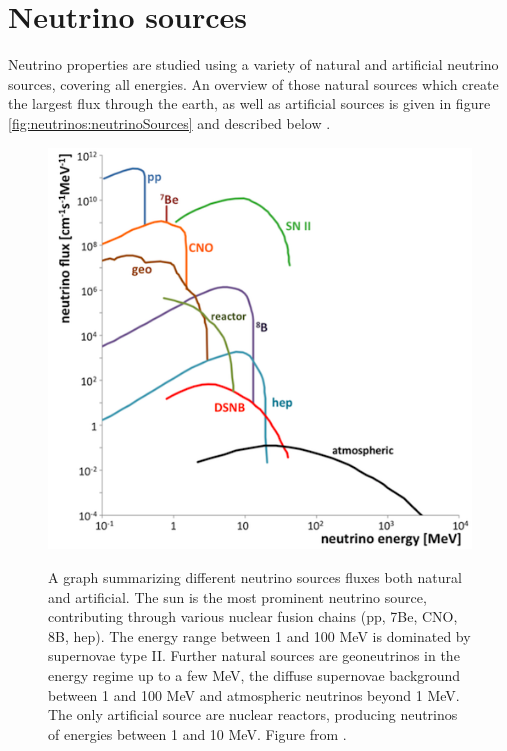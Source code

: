 	\section{Neutrino sources}
	\label{ch:Introduction:sec:neutrinoSources}
	Neutrino properties are studied using a variety of natural and artificial neutrino sources, covering all energies. An overview of those natural sources which create the largest flux through the earth, as well as artificial sources is given in figure \ref{fig:neutrinos:neutrinoSources} and described below \cite{Grupen}.
	\begin{figure}
		\begin{minipage}{0.65\textwidth}
			\includegraphics[width=\textwidth]{graphics/neutrinos/neutrinoSpectrum.png}
		\end{minipage}
		\begin{minipage}{0.34\textwidth}
		\caption[Neutrino Sources]{~}A graph summarizing different neutrino sources fluxes both natural and artificial. The sun is the most prominent neutrino source, contributing through various nuclear fusion chains (pp, 7Be, CNO, 8B, hep). The energy range between 1 and 100 MeV is dominated by supernovae type II. Further natural sources are geoneutrinos in the energy regime up to a few MeV, the diffuse supernovae background between 1 and 100 MeV and atmospheric neutrinos beyond 1 MeV. The only artificial source are nuclear reactors, producing neutrinos of energies between 1 and 10 MeV. Figure from \cite{fraenkle}.

\end{minipage}
\end{figure}
